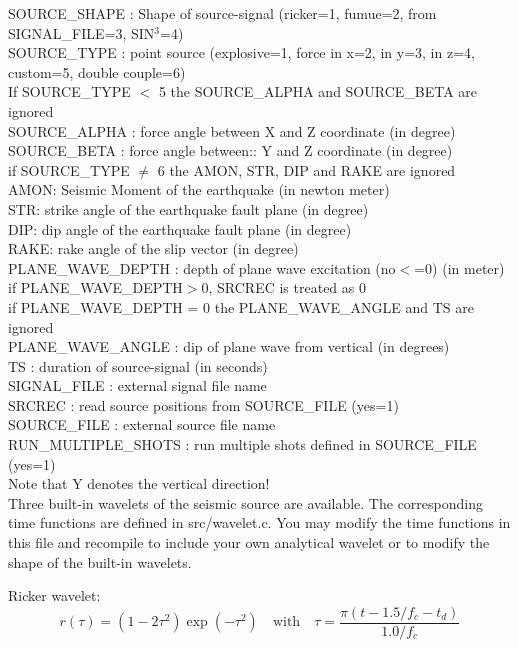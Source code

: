 \documentclass[11pt,onecolumn,oneside]{article}
\begin{document}
SOURCE\_SHAPE : Shape of source-signal (ricker=1, fumue=2, from SIGNAL\_FILE=3, SIN$^3$=4) \\
SOURCE\_TYPE : point source (explosive=1, force in x=2, in y=3, in z=4, custom=5, double couple=6) \\
If SOURCE\_TYPE $<$ 5 the SOURCE\_ALPHA and SOURCE\_BETA are ignored \\
SOURCE\_ALPHA : force angle between X and Z coordinate (in degree)\\
SOURCE\_BETA : force angle between:: Y and Z coordinate (in degree)\\
if SOURCE\_TYPE $\ne$ 6 the AMON, STR, DIP and RAKE are ignored\\
AMON: Seismic Moment of the earthquake (in newton meter)\\
STR: strike angle of the earthquake fault plane (in degree)\\
DIP: dip angle of the earthquake fault plane (in degree)\\
RAKE: rake angle of the slip vector (in degree)\\
PLANE\_WAVE\_DEPTH : depth of plane wave excitation (no$<$=0) (in meter)\\
if PLANE\_WAVE\_DEPTH$>$0, SRCREC is treated as 0\\
if PLANE\_WAVE\_DEPTH = 0 the PLANE\_WAVE\_ANGLE and TS  are ignored\\
PLANE\_WAVE\_ANGLE : dip of plane wave from vertical (in degrees)\\
TS : duration of source-signal (in seconds)\\
SIGNAL\_FILE : external signal file name \\
SRCREC : read source positions from SOURCE\_FILE (yes=1)\\
SOURCE\_FILE : external source file name \\
RUN\_MULTIPLE\_SHOTS : run multiple shots defined in SOURCE\_FILE (yes=1)\\
Note that Y denotes the vertical direction!\\

Three built-in wavelets of the seismic source are available. The corresponding time functions are defined in src/wavelet.c. You may modify the time functions in this file and recompile to include your
own analytical wavelet or to modify the shape of the built-in wavelets.

Ricker wavelet:
\begin{equation}
r(\tau)=\left(1-2\tau^2\right)\exp(-\tau^2) \quad \mbox{with} \quad \tau=\frac{\pi(t-1.5/f_c-t_d)}{1.0/f_c}
\label{eq_ricker}
\end{equation}
\end{document}
